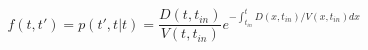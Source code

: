\begin{equation}
f(t,t') = p(t',t|t)=  \frac{D(t,t_{in})}{V(t,t_{in})}e^{-\int_{t_{in}}^t D(x,t_{in})/V(x,t_{in}) dx}
\end{equation}